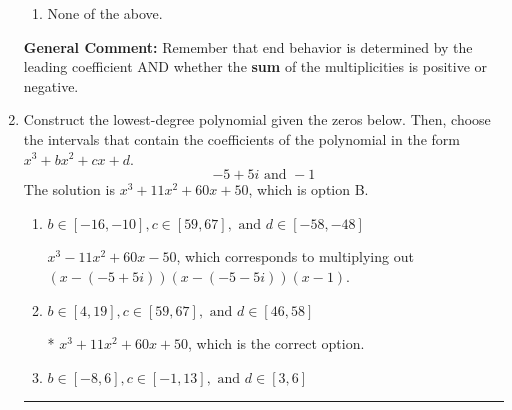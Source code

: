 \documentclass{extbook}[14pt]
\newcommand{\litem}[1]{\item #1

\rule{\textwidth}{0.4pt}}
\begin{document}
\begin{enumerate}
{\begin{enumerate}[label=\Alph*.]
\item None of the above.\end{enumerate}
\textbf{General Comment:} Remember that end behavior is determined by the leading coefficient AND whether the \textbf{sum} of the multiplicities is positive or negative.
}
\litem{
Construct the lowest-degree polynomial given the zeros below. Then, choose the intervals that contain the coefficients of the polynomial in the form $x^3+bx^2+cx+d$.
\[ -5 + 5 i \text{ and } -1 \]The solution is \( x^{3} +11 x^{2} +60 x + 50 \), which is option B.\begin{enumerate}[label=\Alph*.]
\item \( b \in [-16, -10], c \in [59, 67], \text{ and } d \in [-58, -48] \)

$x^{3} -11 x^{2} +60 x -50$, which corresponds to multiplying out $(x-(-5 + 5 i))(x-(-5 - 5 i))(x -1)$.
\item \( b \in [4, 19], c \in [59, 67], \text{ and } d \in [46, 58] \)

* $x^{3} +11 x^{2} +60 x + 50$, which is the correct option.
\item \( b \in [-8, 6], c \in [-1, 13], \text{ and } d \in [3, 6] \)


\end{enumerate}}
\end{enumerate}
\end{document}
